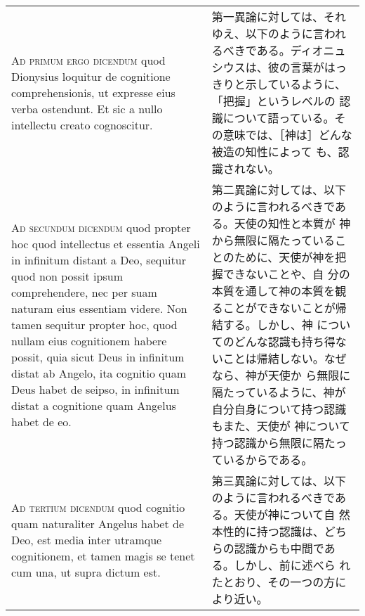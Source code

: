 \documentclass[10pt]{jsarticle} %
\begin{document}
\begin{longtable}{p{21em}p{21em}}
{\scshape Ad primum ergo dicendum} quod Dionysius loquitur de
cognitione comprehensionis, ut expresse eius verba ostendunt. Et sic a
nullo intellectu creato cognoscitur.


&

第一異論に対しては、それゆえ、以下のように言われるべきである。ディオニュ
シウスは、彼の言葉がはっきりと示しているように、「把握」というレベルの
認識について語っている。その意味では、［神は］どんな被造の知性によって
も、認識されない。

\\


{\scshape Ad secundum dicendum} quod propter hoc quod intellectus et
essentia Angeli in infinitum distant a Deo, sequitur quod non possit
ipsum comprehendere, nec per suam naturam eius essentiam videre. Non
tamen sequitur propter hoc, quod nullam eius cognitionem habere
possit, quia sicut Deus in infinitum distat ab Angelo, ita cognitio
quam Deus habet de seipso, in infinitum distat a cognitione quam
Angelus habet de eo.


&

第二異論に対しては、以下のように言われるべきである。天使の知性と本質が
神から無限に隔たっていることのために、天使が神を把握できないことや、自
分の本質を通して神の本質を観ることができないことが帰結する。しかし、神
についてのどんな認識も持ち得ないことは帰結しない。なぜなら、神が天使か
ら無限に隔たっているように、神が自分自身について持つ認識もまた、天使が
神について持つ認識から無限に隔たっているからである。


\\


{\scshape Ad tertium dicendum} quod cognitio quam naturaliter Angelus
habet de Deo, est media inter utramque cognitionem, et tamen magis se
tenet cum una, ut supra dictum est.



&

第三異論に対しては、以下のように言われるべきである。天使が神について自
然本性的に持つ認識は、どちらの認識からも中間である。しかし、前に述べら
れたとおり、その一つの方により近い。


\end{longtable}
\end{document}
